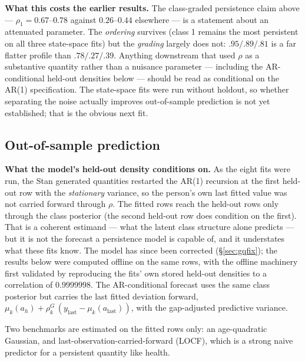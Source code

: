 \documentclass[11pt]{article}
\begin{document}
\textbf{What this costs the earlier results.} The class-graded persistence
claim above --- $\rho_1 = 0.67$--$0.78$ against $0.26$--$0.44$ elsewhere ---
is a statement about an attenuated parameter. The \emph{ordering} survives
(class 1 remains the most persistent on all three state-space fits) but the
\emph{grading} largely does not: $.95 / .89 / .81$ is a far flatter profile
than $.78 / .27 / .39$. Anything downstream that used $\rho$ as a
substantive quantity rather than a nuisance parameter --- including the
AR-conditional held-out densities below --- should be read as conditional on
the AR(1) specification. The state-space fits were run without holdout, so
whether separating the noise actually improves out-of-sample prediction is
not yet established; that is the obvious next fit.

\subsection*{Out-of-sample prediction}

\textbf{What the model's held-out density conditions on.} As the eight fits
were run, the Stan generated quantities restarted the AR(1) recursion at the
first held-out row with the \emph{stationary} variance, so the person's own
last fitted value was not carried forward through $\rho$. The fitted rows reach the held-out
rows only through the class posterior (the second held-out row does condition
on the first). That is a coherent estimand --- what the latent class
structure alone predicts --- but it is not the forecast a persistence model
is capable of, and it understates what these fits know. The model has since
been corrected (\S\ref{sec:gqfix}); the results below were computed offline
on the same rows, with the offline machinery first validated by reproducing
the fits' own stored held-out densities to a correlation of $0.9999998$. The
AR-conditional forecast uses the same class posterior but carries the last
fitted deviation forward, $\mu_k(a_h) + \rho_k^{G}\,(y_{\text{last}} -
\mu_k(a_{\text{last}}))$, with the gap-adjusted predictive variance.

Two benchmarks are estimated on the fitted rows only: an age-quadratic
Gaussian, and last-observation-carried-forward (LOCF), which is a strong
naive predictor for a persistent quantity like health.
\end{document}
